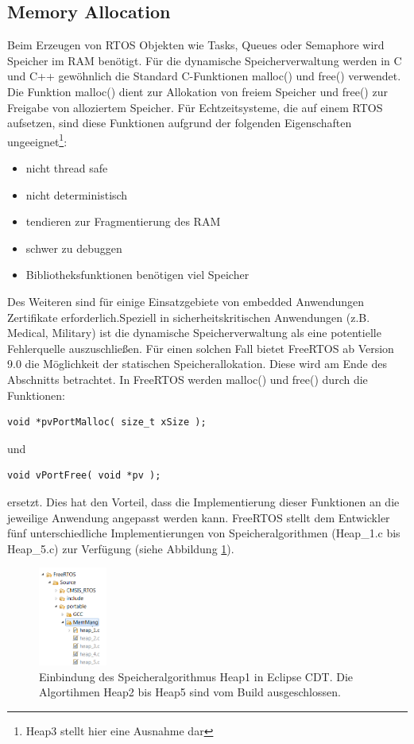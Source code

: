 \subsection{Memory Allocation}
Beim Erzeugen von RTOS Objekten wie Tasks, Queues oder Semaphore wird Speicher im RAM benötigt. Für die dynamische Speicherverwaltung werden in C und C++ ge\-wöhnlich die Standard C-Funktionen malloc() und free() verwendet. Die Funktion malloc() dient zur Allokation von freiem Speicher und free() zur Freigabe von alloziertem Speicher. Für Echtzeitsysteme, die auf einem RTOS aufsetzen, sind diese Funktionen aufgrund der folgenden Eigenschaften\cite{MasteringFreeRtos} ungeeignet\footnote{Heap3 stellt hier eine Ausnahme dar}:
\begin{itemize}
	\item nicht thread safe
	\item nicht deterministisch
	\item tendieren zur Fragmentierung des RAM
	\item schwer zu debuggen
	\item Bibliotheksfunktionen benötigen viel Speicher
\end{itemize}
Des Weiteren sind für einige Einsatzgebiete von embedded Anwendungen Zertifikate erforderlich.\newline Speziell in sicherheitskritischen Anwendungen (z.B. Medical, Military) ist die dynamische Speicherverwaltung als eine potentielle Fehlerquelle auszuschließen. Für einen solchen Fall bietet FreeRTOS ab Version 9.0 die Möglichkeit der statischen Speicherallokation. Diese wird am Ende des Abschnitts betrachtet. In FreeRTOS werden malloc() und free() durch die Funktionen:  
\begin{lstlisting}[label=lst:vPortMalloc1, numbers = none]
void *pvPortMalloc( size_t xSize );
\end{lstlisting}
und
\begin{lstlisting}[label=lst:vPortFree1, numbers = none]
void vPortFree( void *pv );
\end{lstlisting}
ersetzt. Dies hat den Vorteil, dass die Implementierung dieser Funktionen an die jeweilige Anwendung angepasst werden kann. FreeRTOS stellt dem Entwickler fünf unterschiedliche Implementierungen von Speicheralgorithmen (Heap\_1.c bis Heap\_5.c) zur Verfügung (siehe Abbildung \ref{fig:HeapsEclipse}). 
\begin{figure}[htb]
	\centering
		\includegraphics[width=0.2\textwidth]{Pictures/Eclipse/Heaps.png}
	\caption{Einbindung des Speicheralgorithmus Heap1 in Eclipse CDT. Die Algortihmen Heap2 bis Heap5 sind vom Build ausgeschlossen.}
	\label{fig:HeapsEclipse}
\end{figure}
